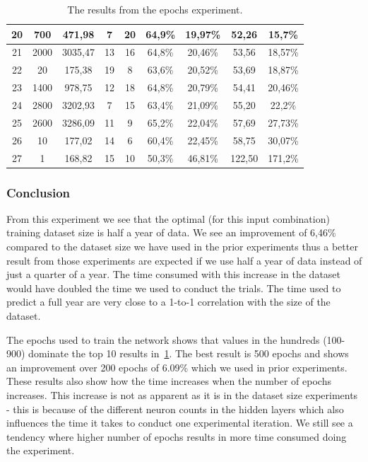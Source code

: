 \begin{table}[H]
{\begin{tabular}{|c|c|c|c|c|c|c|c|c|}
	20 & 700  & 471,98 & 7  & 20 & 64,9\% & 19,97\% & 52,26 & 15,7\% \\ \hline
	21 & 2000 & 3035,47 & 13 & 16 & 64,8\% & 20,46\% & 53,56 & 18,57\% \\ \hline
	22 & 20   & 175,38 & 19 & 8  & 63,6\% & 20,52\% & 53,69 & 18,87\% \\ \hline
	23 & 1400 & 978,75 & 12 & 18 & 64,8\% & 20,79\% & 54,41 & 20,46\% \\ \hline
	24 & 2800 & 3202,93 & 7  & 15 & 63,4\% & 21,09\% & 55,20 & 22,2\% \\ \hline
	25 & 2600 & 3286,09 & 11 & 9  & 65,2\% & 22,04\% & 57,69 & 27,73\% \\ \hline
	26 & 10   & 177,02 & 14 & 6  & 60,4\% & 22,45\% & 58,75 & 30,07\% \\ \hline
	27 & 1    & 168,82 & 15 & 10 & 50,3\% & 46,81\% & 122,50 & 171,2\% \\ \hline
	\end{tabular}
}
\caption{The results from the epochs experiment.} %
\label{table:Epochs} %
\end{table}

\subsubsection{Conclusion}
From this experiment we see that the optimal (for this input combination) training dataset size is half a year of data. We see an improvement of 6,46\% compared to the dataset size we have used in the prior experiments thus a better result from those experiments are expected if we use half a year of data instead of just a quarter of a year. The time consumed with this increase in the dataset would have doubled the time we used to conduct the trials. The time used to predict a full year are very close to a 1-to-1 correlation with the size of the dataset.

The epochs used to train the network shows that values in the hundreds (100-900) dominate the top 10 results in~\ref{table:Epochs}. The best result is 500 epochs and shows an improvement over 200 epochs of 6.09\% which we used in prior experiments. These results also show how the time increases when the number of epochs increases. This increase is not as apparent as it is in the dataset size experiments - this is because of the different neuron counts in the hidden layers which also influences the time it takes to conduct one experimental iteration. We still see a tendency where higher number of epochs results in more time consumed doing the experiment.

